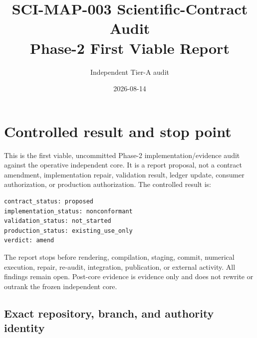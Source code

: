 \documentclass[10pt]{article}
\title{SCI-MAP-003 Scientific-Contract Audit\\
Phase-2 First Viable Report}
\author{Independent Tier-A audit}
\date{2026-08-14}
\begin{document}
\maketitle

\section{Controlled result and stop point}

This is the first viable, uncommitted Phase-2 implementation/evidence audit
against the operative independent core.  It is a report proposal, not a
contract amendment, implementation repair, validation result, ledger update,
consumer authorization, or production authorization.  The controlled result
is:
\begin{verbatim}
contract_status: proposed
implementation_status: nonconformant
validation_status: not_started
production_status: existing_use_only
verdict: amend
\end{verbatim}

The report stops before rendering, compilation, staging, commit, numerical
execution, repair, re-audit, integration, publication, or external activity.
All findings remain open.  Post-core evidence is evidence only and does not
rewrite or outrank the frozen independent core.

\subsection{Exact repository, branch, and authority identity}
\end{document}
